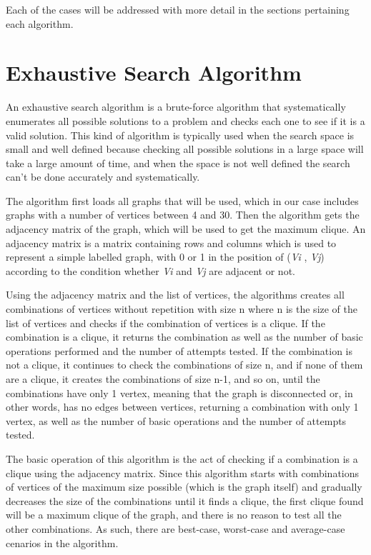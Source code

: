 \documentclass[]{revdetua}
\begin{document}
Each of the cases will be addressed with more detail in the sections pertaining each algorithm.

\section{Exhaustive Search Algorithm}

An exhaustive search algorithm is a brute-force algorithm that systematically enumerates all possible solutions to a problem and checks each one to see if it is a valid solution. This kind of algorithm is typically used when the search space is small and well defined because checking all possible solutions in a large space will take a large amount of time, and when the space is not well defined the search can't be done accurately and systematically.  

The algorithm first loads all graphs that will be used, which in our case includes graphs with a number of vertices between 4 and 30. Then the algorithm gets the adjacency matrix of the graph, which will be used to get the maximum clique. An adjacency matrix is a matrix containing rows and columns which is used to represent a simple labelled graph, with 0 or 1 in the position of (\textit{Vi} , \textit{Vj}) according to the condition whether \textit{Vi} and \textit{Vj} are adjacent or not. 

Using the adjacency matrix and the list of vertices, the algorithms creates all combinations of vertices without repetition with size n  where n is the size of the list of vertices and checks if the combination of vertices is a clique. If the combination is a clique, it returns the combination as well as the number of basic operations performed and the number of attempts tested. If the combination is not a clique, it continues to check the combinations of size n, and if none of them are a clique, it creates the combinations of size n-1, and so on, until the combinations have only 1 vertex, meaning that the graph is disconnected or, in other words, has no edges between vertices, returning a combination with only 1 vertex, as well as the number of basic operations and the number of attempts tested.

The basic operation of this algorithm is the act of checking if a combination is a clique using the adjacency matrix. Since this algorithm starts with combinations of vertices of the maximum size possible (which is the graph itself) and gradually decreases the size of the combinations until it finds a clique, the first clique found will be a maximum clique of the graph, and there is no reason to test all the other combinations. As such, there are best-case, worst-case and average-case cenarios in the algorithm.
\end{document}
